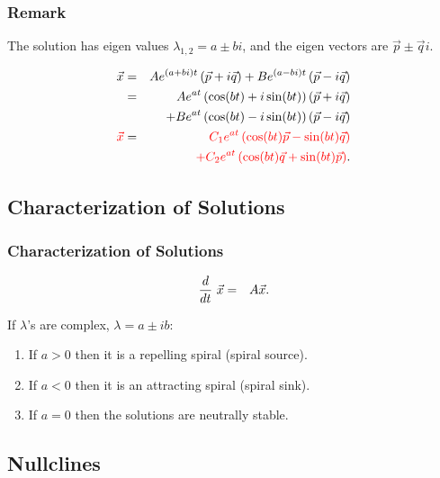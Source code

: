 \begin{frame}
  \frametitle{Remark}

  The solution has eigen values $\lambda_{1,2}=a\pm bi$, and the eigen
  vectors are $\vec{p}\pm \vec{q}i$.

  \begin{eqnarray*}
    \vec{x} & = & Ae^{(a+bi)t} \lp \vec{p} + i \vec{q} \rp 
             + Be^{(a-bi)t}\lp \vec{p} - i \vec{q} \rp \\
    & = & Ae^{at} \lp \cos(bt) + i \sin(bt) \rp \lp \vec{p} + i \vec{q} \rp \\
    & & + Be^{at}\lp \cos(bt) - i \sin(bt) \rp \lp \vec{p} - i \vec{q} \rp \\
    \redText{\vec{x}} & = & 
    \redText{C_1 e^{at} \lp \cos(bt) \vec{p} - \sin(bt) \vec{q} \rp} \\
    &   & \redText{+ C_2 e^{at} \lp \cos(bt) \vec{q} + \sin(bt) \vec{p} \rp}.
  \end{eqnarray*}

\end{frame}



\subsection{Characterization of Solutions}

\begin{frame}
  \frametitle{Characterization of Solutions}

  \begin{eqnarray*}
    \deriv{~}{t} \vec{x} & = & A \vec{x}.
  \end{eqnarray*}

  If $\lambda$'s are complex, $\lambda = a \pm ib$:
  \begin{enumerate}
  \item If $a>0$ then it is a repelling spiral (spiral source).
  \item If $a<0$ then it is an attracting spiral (spiral sink).
  \item If $a=0$ then the solutions are neutrally stable.
  \end{enumerate}

\end{frame}


\subsection{Nullclines}

